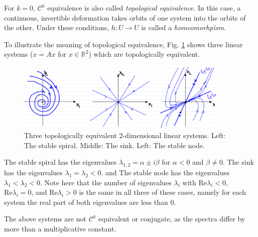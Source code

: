 \begin{definition}
	For $k=0$, $\mathcal{C}^{k}$ equivalence is also called \emph{topological equivalence}. In this case, a continuous, invertible deformation takes orbits of one system into the orbits of the other. Under these conditions,  $h:U\to U$ is called a \emph{homeomorhpism}.
\end{definition}

\begin{ex}[Topologically equivalent linear systems for $n=2$]
	To illustrate the meaning of topological equivalence, Fig. \ref{fig:topo_equiv} shows three linear systems ($\dot{{x} } = {Ax}  $ for $x\in \mathbb{R}^2$) which are topologically equivalent.
	\begin{figure}[h!]
		\centering
		\includegraphics[width=0.9\textwidth]{figures/ch2/13topo_equiv.png}
		\caption{Three topologically equivalent 2-dimensional linear systems. Left: The stable spiral. Middle: The sink. Left: The stable node.}
		\label{fig:topo_equiv}
	\end{figure}

The stable spiral has the eigenvalues $\lambda _{1,2}= \alpha \pm i \beta $ for $\alpha <0$ and $\beta \neq 0$. The sink has the eigenvalues $\lambda_1=\lambda_2<0$. and The stable node has the eigenvalues $\lambda_1 < \lambda_2 < 0$. Note here that the number of eigenvalues $\lambda_i$ with $ \textrm{Re} \lambda_i <0$, $ \textrm{Re} \lambda _i=0$, and $ \textrm{Re} \lambda _i>0$ is the same in all three of these cases, namely for each system the real part of both eigenvalues are less than 0.	
\end{ex}

\begin{remark}[]
	The above systems are not $\mathcal{C}^k$ equivalent or conjugate, as the spectra differ by more than a multiplicative constant.
\end{remark}


